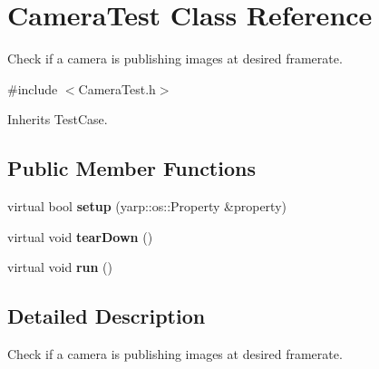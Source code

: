 \section{Camera\+Test Class Reference}
\label{classCameraTest}


Check if a camera is publishing images at desired framerate.  




{\ttfamily \#include $<$Camera\+Test.\+h$>$}



Inherits Test\+Case.

\subsection*{Public Member Functions}
\begin{DoxyCompactItemize}
\item 
\mbox{\label{classCameraTest_ac059968960ce6deaee9c60623ba2266d}} 
virtual bool {\bfseries setup} (yarp\+::os\+::\+Property \&property)
\item 
\mbox{\label{classCameraTest_a9d99fe4d4b8929fbfaf280ed87388dc2}} 
virtual void {\bfseries tear\+Down} ()
\item 
\mbox{\label{classCameraTest_a1c55590d1e9b43051fa8a818559abff2}} 
virtual void {\bfseries run} ()
\end{DoxyCompactItemize}


\subsection{Detailed Description}
Check if a camera is publishing images at desired framerate. 

